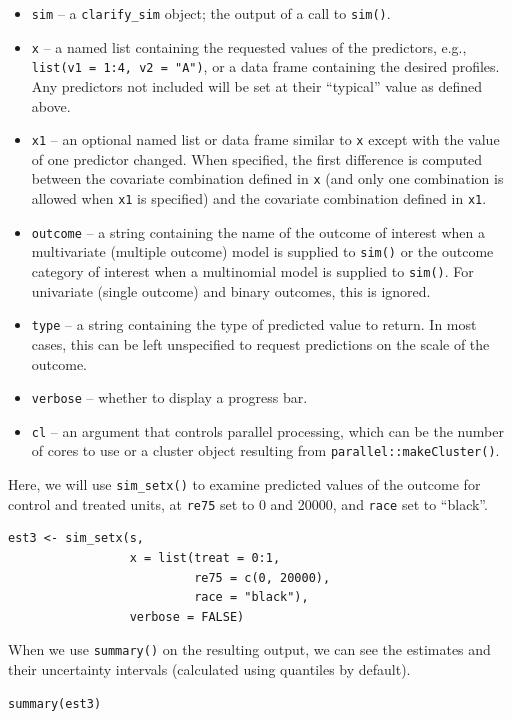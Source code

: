 \begin{itemize}
\item
  \texttt{sim} -- a \texttt{clarify\_sim} object; the output of a call to \texttt{sim()}.
\item
  \texttt{x} -- a named list containing the requested values of the predictors, e.g., \texttt{list(v1\ =\ 1:4,\ v2\ =\ "A")}, or a data frame containing the desired profiles. Any predictors not included will be set at their ``typical'' value as defined above.
\item
  \texttt{x1} -- an optional named list or data frame similar to \texttt{x} except with the value of one predictor changed. When specified, the first difference is computed between the covariate combination defined in \texttt{x} (and only one combination is allowed when \texttt{x1} is specified) and the covariate combination defined in \texttt{x1}.
\item
  \texttt{outcome} -- a string containing the name of the outcome of interest when a multivariate (multiple outcome) model is supplied to \texttt{sim()} or the outcome category of interest when a multinomial model is supplied to \texttt{sim()}. For univariate (single outcome) and binary outcomes, this is ignored.
\item
  \texttt{type} -- a string containing the type of predicted value to return. In most cases, this can be left unspecified to request predictions on the scale of the outcome.
\item
  \texttt{verbose} -- whether to display a progress bar.
\item
  \texttt{cl} -- an argument that controls parallel processing, which can be the number of cores to use or a cluster object resulting from \texttt{parallel::makeCluster()}.
\end{itemize}
Here, we will use \texttt{sim\_setx()} to examine predicted values of the outcome for control and treated units, at \texttt{re75} set to 0 and 20000, and \texttt{race} set to ``black''.
\begin{verbatim}
est3 <- sim_setx(s,
                 x = list(treat = 0:1,
                          re75 = c(0, 20000),
                          race = "black"),
                 verbose = FALSE)
\end{verbatim}
When we use \texttt{summary()} on the resulting output, we can see the estimates and their uncertainty intervals (calculated using quantiles by default).
\begin{verbatim}
summary(est3)
\end{verbatim}
